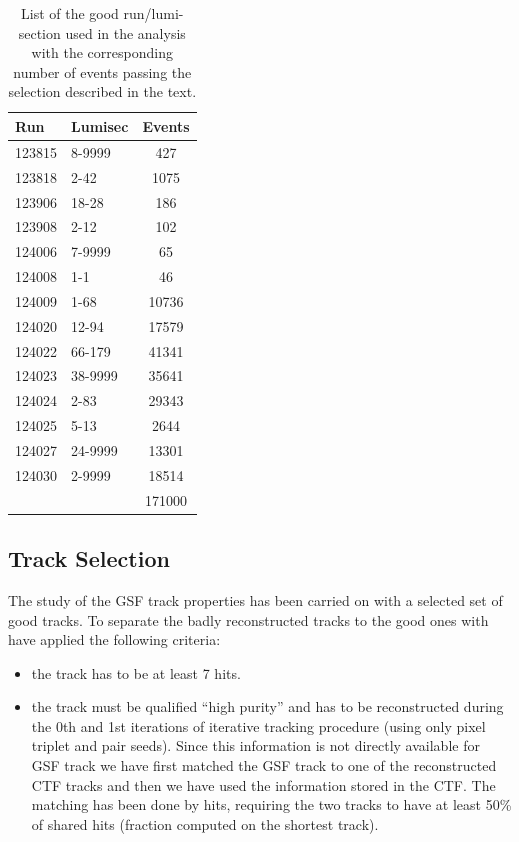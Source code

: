 \begin{table}[htbp]
\begin{center}
\begin{tabular}{|l|l|c|}
\hline
Run  & Lumisec & \multicolumn{1}{l|}{Events} \\ \hline
123815 & 8-9999 & 427 \\ \hline
123818 & 2-42 & 1075 \\ \hline
123906 & 18-28 & 186 \\ \hline
123908 & 2-12 & 102 \\ \hline
124006 & 7-9999 & 65 \\ \hline
124008 & 1-1 & 46 \\ \hline
124009 & 1-68 & 10736 \\ \hline
124020 & 12-94 & 17579 \\ \hline
124022 & 66-179 & 41341 \\ \hline
124023 & 38-9999 & 35641 \\ \hline
124024 & 2-83 & 29343 \\ \hline
124025 & 5-13 & 2644 \\ \hline
124027 & 24-9999 & 13301 \\ \hline
124030 & 2-9999 & 18514 \\ \hline
 &  & 171000 \\ \hline
\end{tabular}
\caption{List of the good run/lumi-section used in the analysis with the corresponding number of events passing the selection described in the text.}
\label{tab:run lumis}
\end{center}
\end{table}

\subsection{Track Selection}

The study of the GSF track properties has been carried on with a selected set of good tracks.
To separate the badly reconstructed tracks to the good ones with have applied the following criteria:

\begin{itemize}
\item the track has to be at least 7 hits.
\item the track must be qualified ``high purity'' and has to be reconstructed during the 0th and 1st iterations
of iterative tracking procedure (using only pixel triplet and pair seeds). Since this information is not 
directly available for GSF track we have first matched the GSF track to one of the reconstructed CTF tracks and
then we have used the information stored in the CTF. The matching has been done by hits, requiring the
two tracks to have at least 50\% of shared hits (fraction computed on the shortest track).
\end{itemize}

